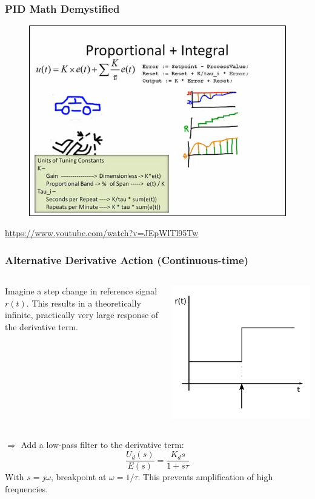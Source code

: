 \begin{frame}
	\frametitle{PID Math Demystified}
	\begin{figure}
\centering
\includegraphics[width=0.7\linewidth]{img/PID_video}
\end{figure}
	\url{https://www.youtube.com/watch?v=JEpWlTl95Tw}
\end{frame}

\begin{frame}
	\frametitle{Alternative Derivative Action (Continuous-time)}
		\begin{columns}
			\begin{column}{0.7\linewidth}
				Imagine a step change in reference signal $r(t)$. 
				This results in a theoretically infinite, practically very large response of
				the derivative term.  
			\end{column}
			\begin{column}{0.3\linewidth}
				\includegraphics[width=\linewidth]{img/piecewise-setpoint}
			\end{column}
		\end{columns}
		$\Rightarrow$ Add a low-pass filter to the derivative term:
		\begin{equation*}
			\frac{U_d(s)}{E(s)} = \frac{K_d s}{1+s\tau}
		\end{equation*}
		With $s=j\omega$, breakpoint at $\omega=1/\tau$. This prevents amplification of high frequencies. 
\end{frame}

